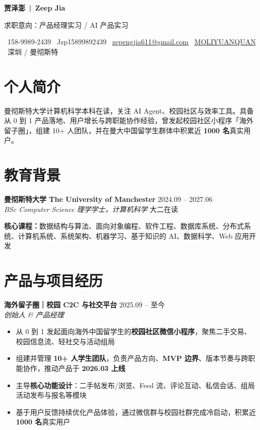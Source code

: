 \documentclass[a4paper,10pt]{article}
\newcommand{\entry}[4]{
  \textbf{#1} \hfill \textcolor{secondary}{\small #2} \\
  \textit{\small #3} \hfill \textcolor{secondary}{\small #4}
}
\newcommand{\projectentry}[3]{
  \textbf{#1} \hfill \textcolor{secondary}{\small #2} \\
  \textit{\small #3}
}
\begin{document}
\fontsize{10.35}{11.65}\selectfont

{\Huge\bfseries\color{primary} 贾泽澎 \,|\, Zeep Jia}

\vspace{0.16em}
{\large\color{secondary} 求职意向：产品经理实习 / AI 产品实习}

\vspace{0.25em}
{\small
\faPhone\ 158-9989-2439 \quad
\faWeixin\ Jzp15899892439 \quad
\faEnvelope\ \href{mailto:zepengjia611@gmail.com}{zepengjia611@gmail.com} \quad
\faGithub\ \href{https://github.com/MOLIYUANQUAN}{MOLIYUANQUAN}
\quad
\faMapMarker*\ 深圳 / 曼彻斯特
}

\vspace{-0.3em}

\section{个人简介}
曼彻斯特大学计算机科学本科在读，关注 AI Agent、校园社区与效率工具。具备从 0 到 1 产品落地、用户增长与跨职能协作经验，曾发起校园社区小程序「海外留子圈」，组建 10+ 人团队，并在曼大中国留学生群体中积累近 \textbf{1000 名}真实用户。

\section{教育背景}
\entry{曼彻斯特大学 The University of Manchester}{2024.09 -- 2027.06}{BSc Computer Science 理学学士，计算机科学}{大二在读}

\vspace{0.2em}
\textbf{核心课程：}数据结构与算法、面向对象编程、软件工程、数据库系统、分布式系统、计算机系统、系统架构、机器学习、基于知识的 AI、数据科学、Web 应用开发

\section{产品与项目经历}

\projectentry{海外留子圈｜校园 C2C 与社交平台}{2025.09 -- 至今}{创始人 \& 产品经理}
\begin{itemize}
    \item 从 0 到 1 发起面向海外中国留学生的\textbf{校园社区微信小程序}，聚焦二手交易、校园信息流、轻社交与活动组局
    \item 组建并管理 \textbf{10+ 人学生团队}，负责产品方向、\textbf{MVP 边界}、版本节奏与跨职能协作，推动产品于 \textbf{2026.03 上线}
    \item 主导\textbf{核心功能设计}：二手帖发布/浏览、Feed 流、评论互动、私信会话、组局活动发布与报名等模块
    \item 基于用户反馈持续优化产品体验，通过微信群与校园社群完成冷启动，积累近 \textbf{1000 名}真实用户
\end{itemize}
\end{document}
